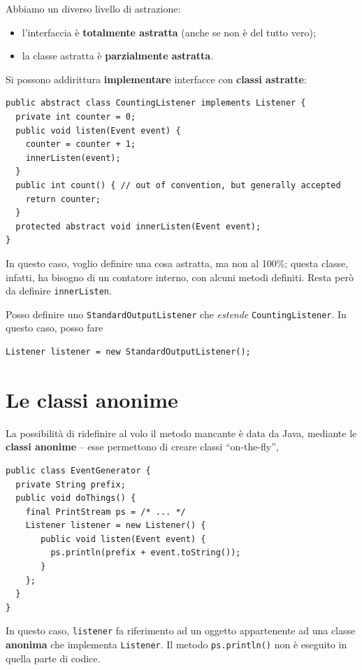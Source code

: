 \documentclass[\fontsizeclass,twocolumn]{\classname}
\theoremstyle{definition}
\theoremstyle{definition}
\begin{document}
Abbiamo un diverso livello di astrazione:
\begin{itemize}
    \item l'interfaccia è \textbf{totalmente astratta} (anche se non è del
        tutto vero);
    \item la classe astratta è \textbf{parzialmente astratta}.
\end{itemize}

Si possono addirittura \textbf{implementare} interfacce con \textbf{classi
astratte}:

\begin{lstlisting}
public abstract class CountingListener implements Listener {
  private int counter = 0;
  public void listen(Event event) {
    counter = counter + 1;
    innerListen(event);
  }
  public int count() { // out of convention, but generally accepted
    return counter;
  }
  protected abstract void innerListen(Event event);
}
\end{lstlisting}


In questo caso, voglio definire una cosa astratta, ma non al 100\%; questa
classe, infatti, ha bisogno di un contatore interno, con alcuni metodi
definiti. Resta però da definire \texttt{innerListen}.

Posso definire uno \texttt{StandardOutputListener} che \emph{estende} \texttt{CountingListener}. In questo caso, posso fare 


\begin{lstlisting}
Listener listener = new StandardOutputListener();
\end{lstlisting}

\section{Le classi anonime}

La possibilità di ridefinire al volo il metodo mancante è data da Java,
mediante le \textbf{classi anonime} -- esse permettono di creare classi
``on\--the\--fly'',

\begin{lstlisting}
public class EventGenerator {
  private String prefix;
  public void doThings() {
    final PrintStream ps = /* ... */
    Listener listener = new Listener() {
       public void listen(Event event) {
         ps.println(prefix + event.toString());
       }
    };
  }
}
\end{lstlisting}

In questo caso, \texttt{listener} fa riferimento ad un oggetto appartenente ad
una classe \textbf{anonima} che implementa \texttt{Listener}. Il metodo
\texttt{ps.println()} non è eseguito in quella parte di codice.
\end{document}
